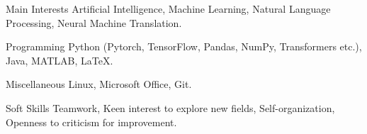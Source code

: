 

\begin{cvskills}

\cvskill
{Main Interests} %
{Artificial Intelligence, Machine Learning, Natural Language Processing, Neural Machine Translation.} %

\cvskill
{Programming} %
{Python (Pytorch, TensorFlow, Pandas, NumPy, Transformers etc.), Java, MATLAB, LaTeX.} %

\cvskill
{Miscellaneous} %
{Linux, Microsoft Office, Git.} %

\cvskill
{Soft Skills} %
{Teamwork, Keen interest to explore new fields, Self-organization, Openness to criticism for improvement.} %

\end{cvskills}
